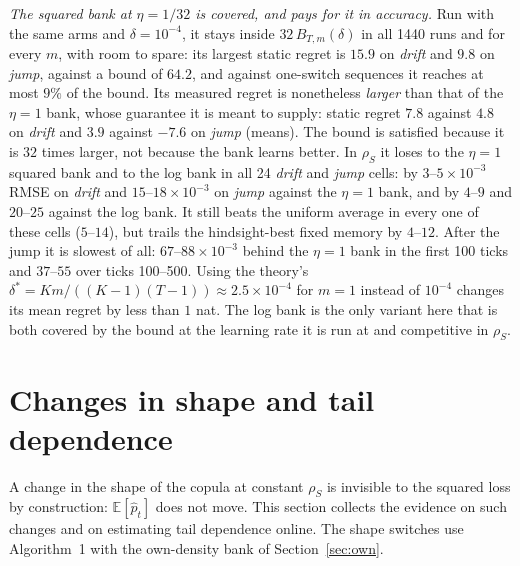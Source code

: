 \emph{The squared bank at $\eta=1/32$ is covered, and pays for it in accuracy.} Run with the same
arms and $\delta=10^{-4}$, it stays inside $32\,B_{T,m}(\delta)$ in all 1440 runs and for every $m$,
with room to spare: its largest static regret is $15.9$ on \emph{drift} and $9.8$ on \emph{jump},
against a bound of $64.2$, and against one-switch sequences it reaches at most $9\%$ of the bound.
Its measured regret is nonetheless \emph{larger} than that of the $\eta=1$ bank, whose
guarantee it is meant to supply: static regret $7.8$ against $4.8$ on \emph{drift} and $3.9$
against $-7.6$ on \emph{jump} (means). The bound is satisfied because it is $32$ times larger, not
because the bank learns better. In $\rho_S$ it loses to the $\eta=1$ squared bank and to the log
bank in all 24 \emph{drift} and \emph{jump} cells: by $3$--$5\times10^{-3}$ RMSE on \emph{drift} and
$15$--$18\times10^{-3}$ on \emph{jump} against the $\eta=1$ bank, and by $4$--$9$ and $20$--$25$
against the log bank. It still beats the uniform average in every one of these cells ($5$--$14$),
but trails the hindsight-best fixed memory by $4$--$12$. After the jump it is slowest of all:
$67$--$88\times10^{-3}$ behind the $\eta=1$ bank in the first 100 ticks and $37$--$55$ over ticks
100--500. Using the theory's $\delta^*=Km/((K-1)(T-1))\approx2.5\times10^{-4}$ for $m=1$ instead of
$10^{-4}$ changes its mean regret by less than $1$ nat. The log bank is the only variant here that is
both covered by the bound at the learning rate it is run at and competitive in $\rho_S$.

\section{Changes in shape and tail dependence}
\label{sec:shape}

A change in the shape of the copula at constant $\rho_S$ is invisible to the squared loss by
construction: $\mathbb E[\hat p_t]$ does not move. This section collects the evidence on such
changes and on estimating tail dependence online. The shape switches use Algorithm~1 with the
own-density bank of Section~\ref{sec:own}. 

